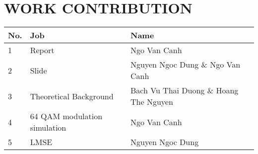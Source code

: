 \section*{WORK CONTRIBUTION}
 {}

\begin{table}[!ht]
\begin{tabular}{|l|l|l|}
    \hline
    \textbf{No.}    & \textbf{Job}      & \textbf{Name} \\ \hline
    1 & Report & Ngo Van Canh  \\ \hline
    2 & Slide & Nguyen Ngoc Dung \& Ngo Van Canh \\ \hline
    3 & Theoretical Background & Bach Vu Thai Duong \& Hoang The Nguyen \\ \hline
    4 & 64 QAM modulation simulation & Ngo Van Canh \\ \hline
    5 & LMSE & Nguyen Ngoc Dung \\ \hline
\end{tabular}
\end{table}

\newpage